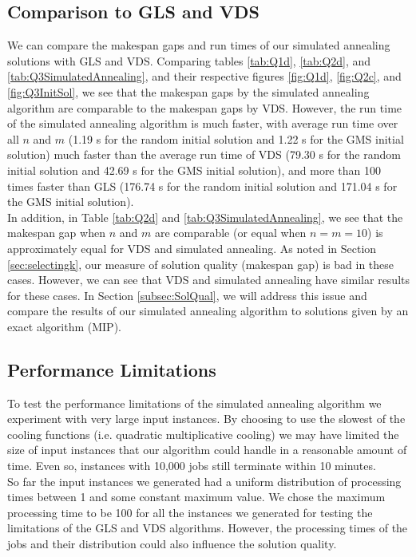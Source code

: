 \documentclass[12pt,a4paper,reqno]{article}
\begin{document}
\subsection{Comparison to GLS and VDS} \label{subsec:SimAnn_Comp}
We can compare the makespan gaps and run times of our simulated annealing solutions with GLS and VDS. 
Comparing tables \ref{tab:Q1d}, \ref{tab:Q2d}, and \ref{tab:Q3SimulatedAnnealing}, and their respective figures \ref{fig:Q1d}, \ref{fig:Q2c}, and \ref{fig:Q3InitSol}, we see that the makespan gaps by the simulated annealing algorithm are comparable to the makespan gaps by VDS. However, the run time of the simulated annealing algorithm is much faster, with average run time over all $n$ and $m$ (1.19 s for the random initial solution and 1.22 s for the GMS initial solution) much faster than the average run time of VDS (79.30 s for the random initial solution and 42.69 s for the GMS initial solution), and more than 100 times faster than GLS (176.74 s for the random initial solution and 171.04 s for the GMS initial solution). \\

In addition, in Table \ref{tab:Q2d} and \ref{tab:Q3SimulatedAnnealing}, we see that the makespan gap when $n$ and $m$ are comparable (or equal when $n=m=10$) is approximately equal for VDS and simulated annealing. As noted in Section \ref{sec:selectingk}, our measure of solution quality (makespan gap) is bad in these cases. However, we can see that VDS and simulated annealing have similar results for these cases. In Section \ref{subsec:SolQual}, we will address this issue and compare the results of our simulated annealing algorithm to solutions given by an exact algorithm (MIP). 

\subsection{Performance Limitations} \label{subsec:SimAnn_Limit}
To test the performance limitations of the simulated annealing algorithm we experiment with very large input instances. By choosing to use the slowest of the cooling functions (i.e. quadratic multiplicative cooling) we may have limited the size of input instances that our algorithm could handle in a reasonable amount of time. Even so, instances with 10,000 jobs still terminate within 10 minutes. \\

So far the input instances we generated had a uniform distribution of processing times between 1 and some constant maximum value. We chose the maximum processing time to be 100 for all the instances we generated for testing the limitations of the GLS and VDS algorithms. However, the processing times of the jobs and their distribution could also influence the solution quality. \\
\end{document}
